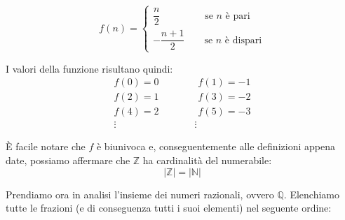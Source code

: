 \begin{equation*}
	f(n) =
	\begin{cases}
		\dfrac{n}{2} \qquad \qquad \;\; \text{se $n$ è pari}\\
		-\dfrac{n+1}{2} \qquad \text{se $n$ è dispari}
	\end{cases}
\end{equation*}

I valori della funzione risultano quindi:
\begin{align*}
    f(0) = 0 \qquad \qquad f(1) = -1\\
    f(2) = 1 \qquad \qquad f(3) = -2\\
    f(4) = 2 \qquad \qquad f(5) = -3\\
    \vdots \qquad \qquad \qquad \qquad \vdots \qquad
\end{align*}

È facile notare che $f$ è biunivoca e, conseguentemente alle definizioni appena 
date, possiamo affermare che $\mathbb{Z}$ ha cardinalità del numerabile:
\begin{equation*}
    |\mathbb{Z}| = |\mathbb{N}|
\end{equation*}

Prendiamo ora in analisi l'insieme dei numeri razionali, ovvero $\mathbb{Q}$. 
Elenchiamo tutte le frazioni (e di conseguenza tutti i suoi elementi) nel 
seguente ordine:

